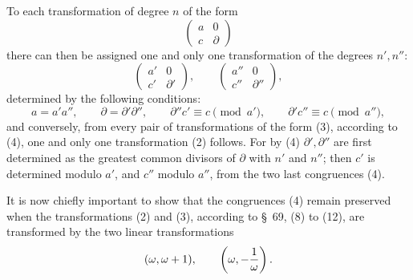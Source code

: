 \documentclass[11pt]{article}
\begin{document}
To each transformation of degree $n$ of the form
\begin{equation}
 \begin{pmatrix}a&0\\ c&\partial\end{pmatrix}
\tag{2}
\end{equation}
there can then be assigned one and only one transformation of the degrees $n',n''$:
\begin{equation}
 \begin{pmatrix}a'&0\\ c'&\partial'\end{pmatrix},
 \qquad
 \begin{pmatrix}a''&0\\ c''&\partial''\end{pmatrix},
\tag{3}
\end{equation}
determined by the following conditions:
\begin{equation}
 a=a'a'',\qquad \partial=\partial'\partial'',\qquad
 \partial''c'\equiv c\pmod {a'},\qquad
 \partial'c''\equiv c\pmod {a''},
\tag{4}
\end{equation}
and conversely, from every pair of transformations of the form (3), according to (4), one and only one transformation (2) follows. For by (4) $\partial',\partial''$ are first determined as the greatest common divisors of $\partial$ with $n'$ and $n''$; then $c'$ is determined modulo $a'$, and $c''$ modulo $a''$, from the two last congruences (4).

It is now chiefly important to show that the congruences (4) remain preserved when the transformations (2) and (3), according to \S~69, (8) to (12), are transformed by the two linear transformations
\[
 (\omega,\omega+1),\qquad \left(\omega,-{1\over\omega}\right).
\]
\end{document}

